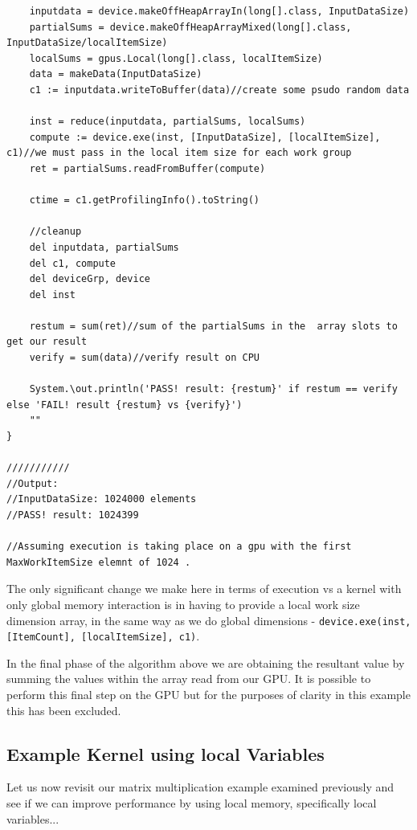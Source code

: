 \documentclass[conc-doc]{subfiles}
\begin{document}
\begin{lstlisting}
	inputdata = device.makeOffHeapArrayIn(long[].class, InputDataSize)
	partialSums = device.makeOffHeapArrayMixed(long[].class, InputDataSize/localItemSize)
	localSums = gpus.Local(long[].class, localItemSize)
	data = makeData(InputDataSize)
	c1 := inputdata.writeToBuffer(data)//create some psudo random data
	
	inst = reduce(inputdata, partialSums, localSums)
	compute := device.exe(inst, [InputDataSize], [localItemSize], c1)//we must pass in the local item size for each work group
	ret = partialSums.readFromBuffer(compute)
	
	ctime = c1.getProfilingInfo().toString()
	
	//cleanup  
	del inputdata, partialSums
	del c1, compute
	del deviceGrp, device
	del inst
	
	restum = sum(ret)//sum of the partialSums in the  array slots to get our result
	verify = sum(data)//verify result on CPU
	
	System.\out.println('PASS! result: {restum}' if restum == verify else 'FAIL! result {restum} vs {verify}')
	""
}

///////////
//Output:
//InputDataSize: 1024000 elements
//PASS! result: 1024399

//Assuming execution is taking place on a gpu with the first MaxWorkItemSize elemnt of 1024 .
\end{lstlisting}

The only significant change we make here in terms of execution vs a kernel with only global memory interaction is in having to provide a local work size dimension array, in the same way as we do global dimensions - \lstinline{device.exe(inst, [ItemCount], [localItemSize], c1)}.

In the final phase of the algorithm above we are obtaining the resultant value by summing the values within the array read from our GPU. It is possible to perform this final step on the GPU but for the purposes of clarity in this example this has been excluded.

\subsection{Example Kernel using local Variables}
Let us now revisit our matrix multiplication example examined previously and see if we can improve performance by using local memory, specifically local variables...
\end{document}
